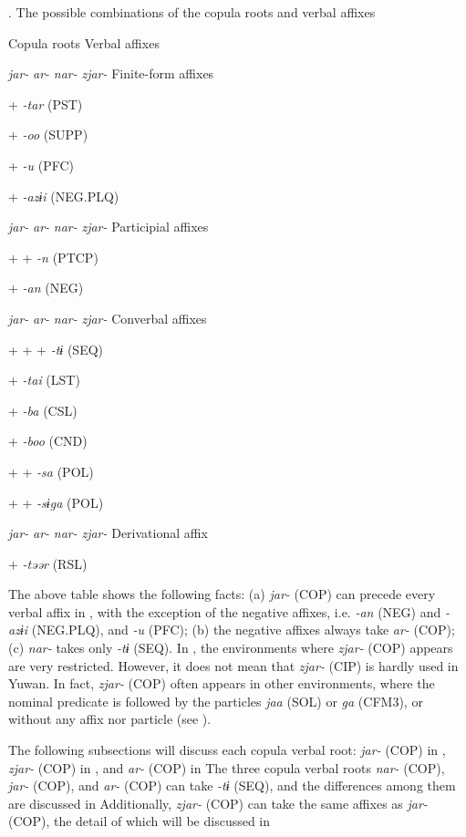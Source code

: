 \begin{styleBeschriftung}
\textmd{}\textmd{. The possible combinations of the copula roots and verbal affixes}
\end{styleBeschriftung}

Copula roots  Verbal affixes

\textit{jar-}  \textit{ar-}  \textit{nar-}  \textit{zjar-}  Finite-form affixes

+        \textit{{}-tar} (PST)

+        \textit{{}-oo} (SUPP)

  +      \textit{{}-u} (PFC)

  +      \textit{{}-azɨi} (NEG.PLQ)

\textit{jar-}  \textit{ar-}  \textit{nar-}  \textit{zjar-}  Participial affixes

+      +  \textit{{}-n} (PTCP)

  +      \textit{{}-an} (NEG)

\textit{jar-}  \textit{ar-}  \textit{nar-}  \textit{zjar-}  Converbal affixes

+  +  +    \textit{{}-tɨ} (SEQ)

+        \textit{{}-tai} (LST)

+        \textit{{}-ba} (CSL)

+        \textit{{}-boo} (CND)

+      +  \textit{{}-sa} (POL)

+      +  \textit{{}-sɨga} (POL)

\textit{jar-}  \textit{ar-}  \textit{nar-}  \textit{zjar-}  Derivational affix

+        \textit{{}-təər} (RSL)

The above table shows the following facts: (a) \textit{jar-} (COP) can precede every verbal affix in , with the exception of the negative affixes, i.e. \textit{-an} (NEG) and \textit{{}-azɨi} (NEG.PLQ), and \textit{{}-u} (PFC); (b) the negative affixes always take \textit{ar-} (COP); (c) \textit{nar-} takes only \textit{{}-tɨ} (SEQ). In , the environments where \textit{zjar-} (COP) appears are very restricted. However, it does not mean that \textit{zjar-} (CIP) is hardly used in Yuwan. In fact, \textit{zjar-} (COP) often appears in other environments, where the nominal predicate is followed by the particles \textit{jaa} (SOL) or \textit{ga} (CFM3), or without any affix nor particle (see ).

The following subsections will discuss each copula verbal root: \textit{jar-} (COP) in , \textit{zjar-} (COP) in , and \textit{ar-} (COP) in  The three copula verbal roots \textit{nar-} (COP), \textit{jar-} (COP), and \textit{ar-} (COP) can take \textit{{}-tɨ} (SEQ), and the differences among them are discussed in  Additionally, \textit{zjar-} (COP) can take the same affixes as \textit{jar-} (COP), the detail of which will be discussed in 

